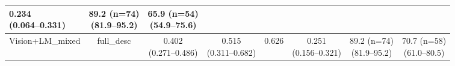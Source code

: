 \documentclass[FCD_GNN.tex]{subfiles}
\begin{document}
\begin{table}[H]
\begin{tabular}{lccccccc}
    \makecell{0.234 \\ (0.064--0.331)} &
    \makecell{89.2 (n=74) \\ (81.9--95.2)} & 
    \makecell{65.9 (n=54) \\ (54.9--75.6)} \\
    \hline
    Vision+LM\_mixed &
    full\_desc &
    \makecell{\colorbox{cyan!15}{0.402} \\ (0.271--0.486)} &
    \makecell{\colorbox{green!15}{0.515} \\ (0.311--0.682)} &
    \colorbox{cyan!15}{0.626} &
    \makecell{\colorbox{cyan!15}{0.251} \\ (0.156--0.321)} &
    \makecell{89.2 (n=74) \\ (81.9--95.2)} & 
    \makecell{\colorbox{cyan!15}{70.7 (n=58)} \\ (61.0--80.5)} \\
    \hline
    \end{tabular}
    \end{table}
    
\end{document}
